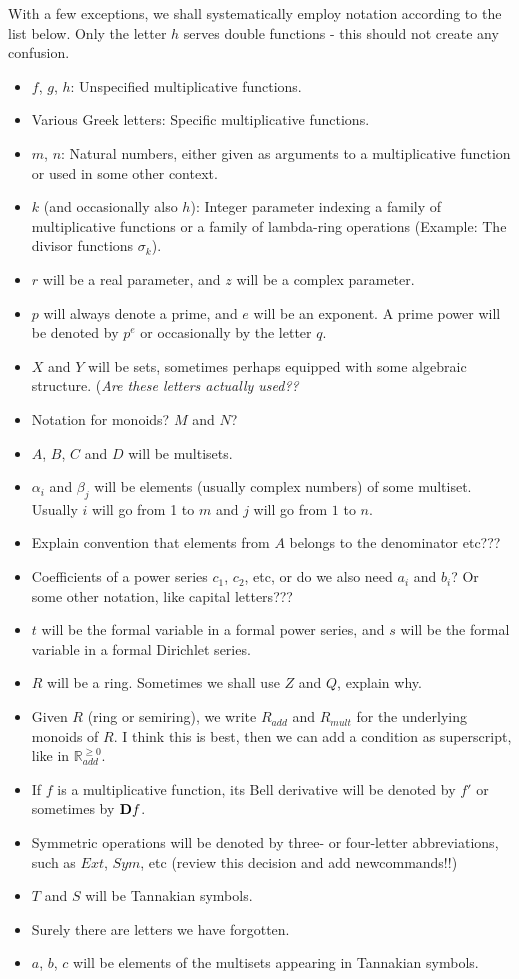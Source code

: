 With a few exceptions, we shall systematically employ notation according to the list below. Only the letter $h$ serves double functions - this should not create any confusion.
\begin{itemize}
\item $f$, $g$, $h$: Unspecified multiplicative functions.
\item Various Greek letters: Specific multiplicative functions.
\item $m$, $n$: Natural numbers, either given as arguments to a multiplicative function or used in some other context.
\item $k$ (and occasionally also $h$): Integer parameter indexing a family of multiplicative functions or a family of lambda-ring operations (Example: The divisor functions $\sigma_k$).
\item $r$ will be a real parameter, and $z$ will be a complex parameter.
\item $p$ will always denote a prime, and $e$ will be an exponent. A prime power will be denoted by $p^e$ or occasionally by the letter $q$.
\item $X$ and $Y$ will be sets, sometimes perhaps equipped with some algebraic structure. (\emph{Are these letters actually used??}
\item Notation for monoids? $M$ and $N$?
\item $A$, $B$, $C$ and $D$ will be multisets.
\item $\alpha_i$ and $\beta_j$ will be elements (usually complex numbers) of some multiset. Usually $i$ will go from 1 to $m$ and $j$ will go from $1$ to $n$.
\item Explain convention that elements from $A$ belongs to the denominator etc???
\item Coefficients of a power series $c_1$, $c_2$, etc, or do we also need $a_i$ and $b_i$? Or some other notation, like capital letters???
\item $t$ will be the formal variable in a formal power series, and $s$ will be the formal variable in a formal Dirichlet series.
\item $R$ will be a ring. Sometimes we shall use $Z$ and $Q$, explain why.
\item Given $R$ (ring or semiring), we write $R_{add}$ and $R_{mult}$ for the underlying monoids of $R$. I think this is best, then we can add a condition as superscript, like in $\mathbb{R}_{add}^{\geq 0}$.
\item If $f$ is a multiplicative function, its Bell derivative will be denoted by $f'$ or sometimes by $\mathbf{D} f$. 
\item Symmetric operations will be denoted by three- or four-letter abbreviations, such as $Ext$, $Sym$, etc (review this decision and add newcommands!!)
\item $T$ and $S$ will be Tannakian symbols.
\item Surely there are letters we have forgotten. 
\item $a$, $b$, $c$ will be elements of the multisets appearing in Tannakian symbols.
\end{itemize}



